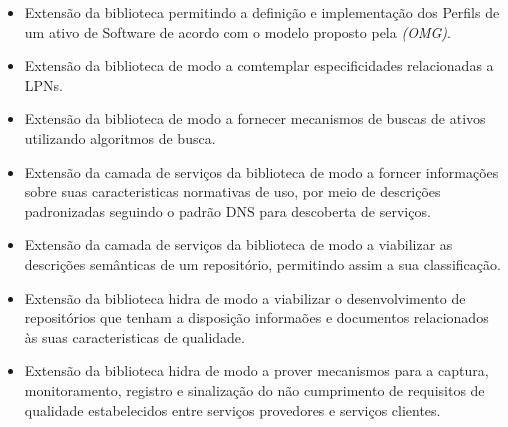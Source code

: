 \begin{itemize}

\item Extensão da biblioteca permitindo a definição e implementação dos Perfils de um ativo de Software de acordo com o modelo proposto pela \textit{(OMG)}.

\item Extensão da biblioteca de modo a comtemplar especificidades relacionadas a LPNs.

\item Extensão da biblioteca de modo a fornecer mecanismos de buscas de ativos utilizando algoritmos de busca.

\item Extensão da camada de serviços da biblioteca de modo a forncer informações sobre suas caracteristicas normativas de uso, por meio de descrições padronizadas seguindo o padrão DNS para descoberta de serviços.

\item Extensão da camada de serviços da biblioteca de modo a viabilizar as descrições semânticas de um repositório, permitindo assim a sua classificação.

\item Extensão da biblioteca hidra de modo a viabilizar o desenvolvimento de repositórios que tenham a disposição informaões e documentos relacionados às suas caracteristicas de qualidade.

\item Extensão da biblioteca hidra de modo a prover mecanismos para a captura, monitoramento, registro e sinalização do não cumprimento de requisitos de qualidade estabelecidos entre serviços provedores e serviços clientes.

\end{itemize}